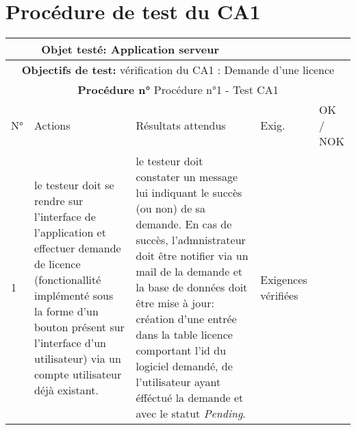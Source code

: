 \section{Procédure de test du CA1}
\begin{table}[!h]
        \centering
        \begin{tabular}{|m{0.6cm}|
                         >{\raggedright\arraybackslash}m{4cm}|
                         >{\raggedright\arraybackslash}m{6.4cm}|
                         >{\raggedright\arraybackslash}m{2cm}|
                         m{1cm}|}
            \hline
            \multicolumn{3}{|c|}{
                \textbf{Objet testé: } Application serveur 
            } & \multicolumn{2}{|c|}{
                \textbf{Version: } version    
            } \\
            \hline
            \multicolumn{5}{|c|}{\textbf{Objectifs de test:} 
                vérification du CA1 : Demande d'une licence} \\
            \hline
            \multicolumn{5}{|c|}{
                \textbf{Procédure n° }Procédure n°1 - Test CA1
            } \\
            \hline
            N° & Actions & Résultats attendus & Exig. & OK / NOK \\
            \hline      %
            1 & le testeur doit se rendre sur l'interface de l'application et 
                effectuer demande de licence (fonctionallité implémenté 
                sous la forme d'un bouton présent sur l'interface d'un
                utilisateur) via un compte utilisateur déjà existant. 
              & le testeur doit constater un message lui indiquant le succès (ou non)
                de sa demande. En cas de succès, l'admnistrateur doit être notifier via 
                un mail de la demande et la base de données doit être mise à jour: 
                création d'une entrée dans la table licence comportant l'id du
                logiciel demandé, de l'utilisateur ayant éfféctué la demande et avec le 
                statut \emph{Pending}.
              & Exigences vérifiées & \\
            \hline
        \end{tabular} 
        \label{tab:tab1}
\end{table}
\newpage

